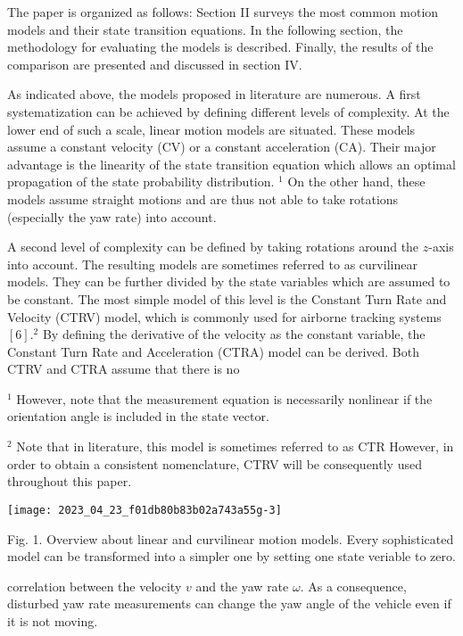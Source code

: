 The paper is organized as follows: Section II surveys the most common motion models and their state transition equations. In the following section, the methodology for evaluating the models is described. Finally, the results of the comparison are presented and discussed in section IV.

As indicated above, the models proposed in literature are numerous. A first systematization can be achieved by defining different levels of complexity. At the lower end of such a scale, linear motion models are situated. These models assume a constant velocity (CV) or a constant acceleration (CA). Their major advantage is the linearity of the state transition equation which allows an optimal propagation of the state probability distribution. ${ }^{1}$ On the other hand, these models assume straight motions and are thus not able to take rotations (especially the yaw rate) into account.

A second level of complexity can be defined by taking rotations around the $z$-axis into account. The resulting models are sometimes referred to as curvilinear models. They can be further divided by the state variables which are assumed to be constant. The most simple model of this level is the Constant Turn Rate and Velocity (CTRV) model, which is commonly used for airborne tracking systems $[6] .{ }^{2}$ By defining the derivative of the velocity as the constant variable, the Constant Turn Rate and Acceleration (CTRA) model can be derived. Both CTRV and CTRA assume that there is no

${ }^{1}$ However, note that the measurement equation is necessarily nonlinear if the orientation angle is included in the state vector.

${ }^{2}$ Note that in literature, this model is sometimes referred to as CTR However, in order to obtain a consistent nomenclature, CTRV will be consequently used throughout this paper.

\begin{center}
	\texttt{[image: 2023\_04\_23\_f01db80b83b02a743a55g-3]}
\end{center}

Fig. 1. Overview about linear and curvilinear motion models. Every sophisticated model can be transformed into a simpler one by setting one state veriable to zero.

correlation between the velocity $v$ and the yaw rate $\omega$. As a consequence, disturbed yaw rate measurements can change the yaw angle of the vehicle even if it is not moving.

